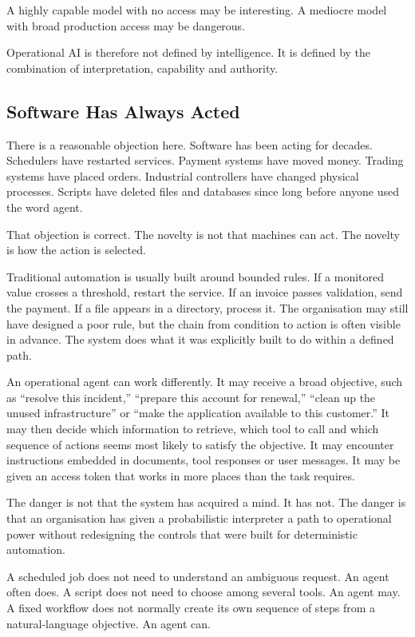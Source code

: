 A highly capable model with no access may be interesting. A mediocre
model with broad production access may be dangerous.

Operational AI is therefore not defined by intelligence. It is defined
by the combination of interpretation, capability and authority.

\subsection{Software Has Always Acted}\label{software-has-always-acted}

There is a reasonable objection here. Software has been acting for
decades. Schedulers have restarted services. Payment systems have moved
money. Trading systems have placed orders. Industrial controllers have
changed physical processes. Scripts have deleted files and databases
since long before anyone used the word agent.

That objection is correct. The novelty is not that machines can act. The
novelty is how the action is selected.

Traditional automation is usually built around bounded rules. If a
monitored value crosses a threshold, restart the service. If an invoice
passes validation, send the payment. If a file appears in a directory,
process it. The organisation may still have designed a poor rule, but
the chain from condition to action is often visible in advance. The
system does what it was explicitly built to do within a defined path.

An operational agent can work differently. It may receive a broad
objective, such as ``resolve this incident,'' ``prepare this account for
renewal,'' ``clean up the unused infrastructure'' or ``make the
application available to this customer.'' It may then decide which
information to retrieve, which tool to call and which sequence of
actions seems most likely to satisfy the objective. It may encounter
instructions embedded in documents, tool responses or user messages. It
may be given an access token that works in more places than the task
requires.

The danger is not that the system has acquired a mind. It has not. The
danger is that an organisation has given a probabilistic interpreter a
path to operational power without redesigning the controls that were
built for deterministic automation.

A scheduled job does not need to understand an ambiguous request. An
agent often does. A script does not need to choose among several tools.
An agent may. A fixed workflow does not normally create its own sequence
of steps from a natural-language objective. An agent can.

